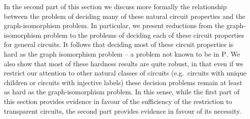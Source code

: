 \documentclass[../paper.tex]{subfiles}
\begin{document}
In the second part of this section we discuss more formally the relationship
between the problem of deciding many of these natural circuit properties and the
graph-isomorphism problem. In particular, we present reductions from the
graph-isomorphism problem to the problems of deciding each of these circuit
properties for general circuits. It follows that deciding most of these circuit
properties is hard as the graph isomorphism problem -- a problem not known to be
in $\mathrm{P}$. We also show that most of these hardness results are quite robust, in
that even if we restrict our attention to other natural classes of circuits
(e.g.\ circuits with unique children or circuits with injective labels) these
decision problems remain at least as hard as the graph-isomorphism problem.
In this sense, while the first part of this section provides evidence in favour of the
sufficiency of the restriction to transparent circuits, the second part provides
evidence in favour of its necessity.










\end{document}
